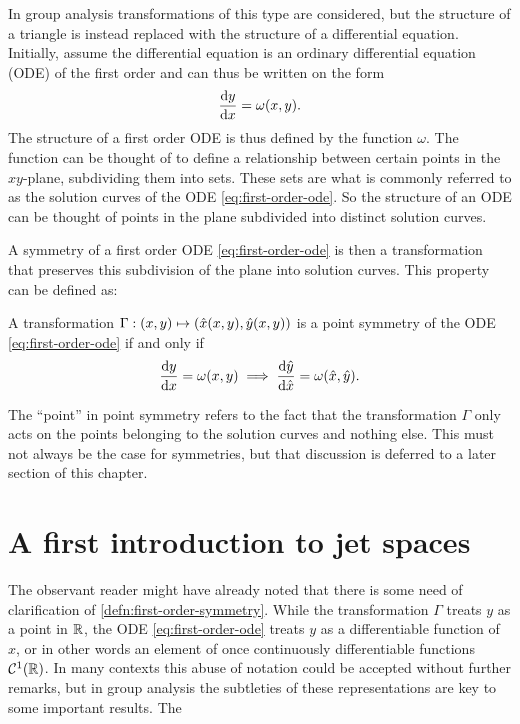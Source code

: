 In group analysis transformations of this type are considered, but the structure of a triangle is instead replaced with the structure of a differential equation.
Initially, assume the differential equation is an ordinary differential equation (ODE) of the first order and can thus be written on the form
\begin{equation} \label{eq:first-order-ode}
  \dv{y}{x} = \omega(x,y).
\end{equation}
The structure of a first order ODE is thus defined by the function \(\omega\).
The function can be thought of to define a relationship between certain points in the \(xy\)-plane, subdividing them into sets.
These sets are what is commonly referred to as the solution curves of the ODE \ref{eq:first-order-ode}.
So the structure of an ODE can be thought of points in the plane subdivided into distinct solution curves.

A symmetry of a first order ODE \ref{eq:first-order-ode} is then a transformation that preserves this subdivision of the plane into solution curves.
This property can be defined as:
\begin{defn} \label{defn:first-order-symmetry}
  A transformation \(\Gamma: \pqty{x,y} \mapsto \pqty{\hat{x}(x,y), \hat{y}(x,y)}\) is a point symmetry of the ODE \ref{eq:first-order-ode} if and only if
  \begin{equation}
    \dv{y}{x} = \omega(x,y)
    \implies
    \dv{\hat{y}}{\hat{x}} = \omega(\hat{x},\hat{y}).
  \end{equation}
\end{defn}
The \enquote{point} in point symmetry refers to the fact that the transformation \(\Gamma\) only acts on the points belonging to the solution curves and nothing else.
This must not always be the case for symmetries, but that discussion is deferred to a later section of this chapter. %

\section{A first introduction to jet spaces}

The observant reader might have already noted that there is some need of clarification of \cref{defn:first-order-symmetry}.
While the transformation \(\Gamma\) treats \(y\) as a point in \(\mathbb{R}\), the ODE \ref{eq:first-order-ode} treats \(y\) as a differentiable function of \(x\), or in other words an element of once continuously differentiable functions \(\mathcal{C}^1(\mathbb{R})\).
In many contexts this abuse of notation could be accepted without further remarks, but in group analysis the subtleties of these representations are key to some important results.
The 

